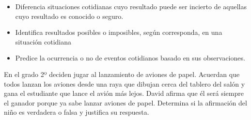
\evidencias

\begin{itemize}
  \item Diferencia situaciones cotidianas cuyo resultado puede ser incierto de aquellas cuyo resultado es conocido o seguro.
  \item Identifica resultados posibles o imposibles, según corresponda, en una situación cotidiana
  \item Predice la ocurrencia o no de eventos cotidianos basado en sus observaciones.
\end{itemize}

\ejemplo

En el grado 2º deciden jugar al lanzamiento de aviones de papel. Acuerdan que todos lanzan los aviones desde una raya que dibujan cerca del tablero del salón y gana el estudiante que lance el avión más lejos. David afirma que él será siempre el ganador porque ya sabe lanzar aviones de papel. Determina si la afirmación del niño es verdadera o falsa y justifica su respuesta.

